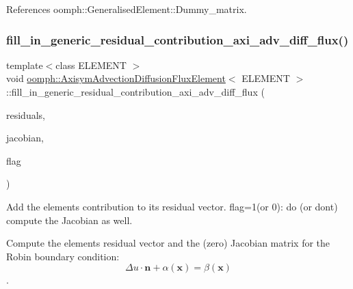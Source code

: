 References oomph\+::\+Generalised\+Element\+::\+Dummy\+\_\+matrix.

\mbox{\label{classoomph_1_1AxisymAdvectionDiffusionFluxElement_a2c11d285cf27d758e1863b15c95f7b31}} 
\subsubsection{\texorpdfstring{fill\+\_\+in\+\_\+generic\+\_\+residual\+\_\+contribution\+\_\+axi\+\_\+adv\+\_\+diff\+\_\+flux()}{fill\_in\_generic\_residual\_contribution\_axi\_adv\_diff\_flux()}}
{\footnotesize\ttfamily template$<$class E\+L\+E\+M\+E\+NT $>$ \\
void \hyperlink{classoomph_1_1AxisymAdvectionDiffusionFluxElement}{oomph\+::\+Axisym\+Advection\+Diffusion\+Flux\+Element}$<$ E\+L\+E\+M\+E\+NT $>$\+::fill\+\_\+in\+\_\+generic\+\_\+residual\+\_\+contribution\+\_\+axi\+\_\+adv\+\_\+diff\+\_\+flux (\begin{DoxyParamCaption}\item[{\hyperlink{classoomph_1_1Vector}{Vector}$<$ double $>$ \&}]{residuals,  }\item[{\hyperlink{classoomph_1_1DenseMatrix}{Dense\+Matrix}$<$ double $>$ \&}]{jacobian,  }\item[{unsigned}]{flag }\end{DoxyParamCaption})\hspace{0.3cm}{\ttfamily [private]}}



Add the element\textquotesingle{}s contribution to its residual vector. flag=1(or 0)\+: do (or don\textquotesingle{}t) compute the Jacobian as well. 

Compute the element\textquotesingle{}s residual vector and the (zero) Jacobian matrix for the Robin boundary condition\+: \[ \Delta u \cdot \mathbf{n} + \alpha (\mathbf{x}) = \beta (\mathbf{x}) \]. 


